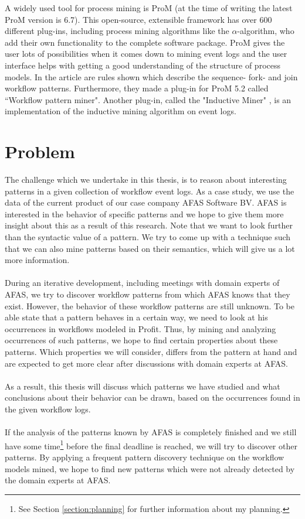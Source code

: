 \documentclass[a4paper,11pt]{article}
\begin{document}
A widely used tool for process mining is ProM \cite{ProM6} (at the time of writing the latest ProM version is 6.7). This open-source, extensible framework has over 600 different plug-ins, including process mining algorithms like the $\alpha$-algorithm, who add their own functionality to the complete software package. ProM gives the user lots of possibilities when it comes down to mining event logs and the user interface helps with getting a good understanding of the structure of process models. In the article \cite{WorkflowMiner2006} are rules shown which describe the sequence- fork- and join workflow patterns. Furthermore, they made a plug-in for ProM 5.2 called ``Workflow pattern miner". Another plug-in, called the "Inductive Miner" \cite{InductiveMiner2013}, is an implementation of the inductive mining algorithm on event logs. 

\section{Problem}
The challenge which we undertake in this thesis, is to reason about interesting patterns in a given collection of workflow event logs. As a case study, we use the data of the current product of our case company AFAS Software BV. AFAS is interested in the behavior of specific patterns and we hope to give them more insight about this as a result of this research. Note that we want to look further than the syntactic value of a pattern. We try to come up with a technique such that we can also mine patterns based on their semantics, which will give us a lot more information.\\
\\
During an iterative development, including meetings with domain experts of AFAS, we try to discover workflow patterns from which AFAS knows that they exist. However, the behavior of these workflow patterns are still unknown. To be able state that a pattern behaves in a certain way, we need to look at his occurrences in workflows modeled in Profit. Thus, by mining and analyzing occurrences of such patterns, we hope to find certain properties about these patterns. Which properties we will consider, differs from the pattern at hand and are expected to get more clear after discussions with domain experts at AFAS.\\
\\
As a result, this thesis will discuss which patterns we have studied and what conclusions about their behavior can be drawn, based on the occurrences found in the given workflow logs.\\
\\
If the analysis of the patterns known by AFAS is completely finished and we still have some time\footnote{See Section \ref{section:planning} for further information about my planning.} before the final deadline is reached, we will try to discover other patterns. By applying a frequent pattern discovery technique on the workflow models mined, we hope to find new patterns which were not already detected by the domain experts at AFAS.
\end{document}
